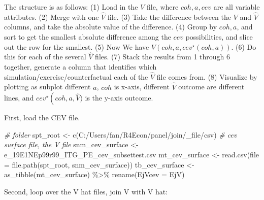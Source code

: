 \documentclass[
]{article}
\newenvironment{Shaded}{\begin{snugshade}}{\end{snugshade}}
\newcommand{\AttributeTok}[1]{\textcolor[rgb]{0.77,0.63,0.00}{#1}}
\newcommand{\CommentTok}[1]{\textcolor[rgb]{0.56,0.35,0.01}{\textit{#1}}}
\newcommand{\FunctionTok}[1]{\textcolor[rgb]{0.00,0.00,0.00}{#1}}
\newcommand{\NormalTok}[1]{#1}
\newcommand{\OtherTok}[1]{\textcolor[rgb]{0.56,0.35,0.01}{#1}}
\newcommand{\SpecialCharTok}[1]{\textcolor[rgb]{0.00,0.00,0.00}{#1}}
\newcommand{\StringTok}[1]{\textcolor[rgb]{0.31,0.60,0.02}{#1}}
\begin{document}
The structure is as follows: (1) Load in the \(V\) file, where
\(coh, a, cev\) are all variable attributes. (2) Merge with one
\(\hat{V}\) file. (3) Take the difference between the \(V\) and
\(\hat{V}\) columns, and take the absolute value of the difference. (4)
Group by \(coh, a\), and sort to get the smallest absolute difference
among the \(cev\) possibilities, and slice out the row for the smallest.
(5) Now We have \(V(coh, a, cev^{\star}(coh, a))\). (6) Do this for each
of the several \(\hat{V}\) files. (7) Stack the results from 1 through 6
together, generate a column that identifies which
simulation/exercise/counterfactual each of the \(\hat{V}\) file comes
from. (8) Visualize by plotting as subplot different \(a\), \(coh\) is
x-axis, different \(\hat{V}\) outcome are different lines, and
\(cev^{\star}\left(coh, a, \hat{V})\) is the y-axis outcome.

First, load the CEV file.

\begin{Shaded}
\begin{Highlighting}[]
\CommentTok{\# folder}
\NormalTok{spt\_root }\OtherTok{\textless{}{-}} \FunctionTok{c}\NormalTok{(}\StringTok{\textquotesingle{}C:/Users/fan/R4Econ/panel/join/\_file/csv\textquotesingle{}}\NormalTok{)}
\CommentTok{\# cev surface file, the V file}
\NormalTok{snm\_cev\_surface }\OtherTok{\textless{}{-}} \StringTok{\textquotesingle{}e\_19E1NEp99r99\_ITG\_PE\_cev\_subsettest.csv\textquotesingle{}}
\NormalTok{mt\_cev\_surface }\OtherTok{\textless{}{-}} \FunctionTok{read.csv}\NormalTok{(}\AttributeTok{file =} \FunctionTok{file.path}\NormalTok{(spt\_root, snm\_cev\_surface))}
\NormalTok{tb\_cev\_surface }\OtherTok{\textless{}{-}} \FunctionTok{as\_tibble}\NormalTok{(mt\_cev\_surface) }\SpecialCharTok{\%\textgreater{}\%}
  \FunctionTok{rename}\NormalTok{(}\AttributeTok{EjVcev =}\NormalTok{ EjV)}
\end{Highlighting}
\end{Shaded}

Second, loop over the V hat files, join V with V hat:
\end{document}

